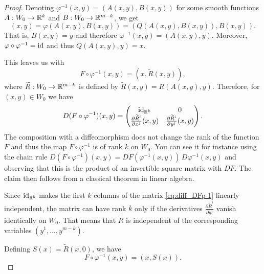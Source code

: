 \begin{proof}
	Denoting $\varphi^{-1}(x,y) = (A(x,y), B(x,y))$ for some smooth functions
	$A : W_0 \to \mathbb{R}^k$ and $B : W_0 \to \mathbb{R}^{m-k}$, we get
	\begin{equation}
		(x,y) = \varphi(A(x,y), B(x,y)) = (Q(A(x,y), B(x,y)), B(x,y)).
	\end{equation}
	That is, $B(x,y) = y$ and therefore $\varphi^{-1}(x,y) = (A(x,y), y)$.
	Moreover, $\varphi \circ \varphi^{-1} = \operatorname{id}$ and thus $Q(A(x,y),y) = x$.

	This leaves us with
	\begin{equation}
		F\circ\varphi^{-1}(x,y) = (x, \widetilde{R}(x,y)),
	\end{equation}
	where $\widetilde{R} : W_0 \to\mathbb{R}^{m-k}$ is defined by $\widetilde{R}(x,y) = R(A(x,y), y)$.
	Therefore, for $(x,y)\in W_0$ we have
	\begin{equation}\label{eq:diff_DFp-1}
		D(F\circ\varphi^{-1})(x,y) = \begin{pmatrix}
			\operatorname{id}_{\mathbb{R}^k}                                        & 0                                                 \\
			\frac{\partial\widetilde{R}^i}{\partial x^j}(x,y) & \frac{\partial\widetilde{R}^i}{\partial y^j}(x,y)
		\end{pmatrix}.
	\end{equation}
	The composition with a diffeomorphism does not change the rank of the function $F$ and
	thus the map $F\circ\varphi^{-1}$ is of rank $k$ on $W_0$.
	You can see it for instance using the chain rule
	$D(F\circ\varphi^{-1})(x,y) = DF(\varphi^{-1}(x,y))\, D\varphi^{-1}(x,y)$ and
	observing that this is the product of an invertible square matrix with $DF$.
	The claim then follows from a classical theorem in linear algebra.

	Since $\operatorname{id}_{\mathbb{R}^k}$ makes the first $k$ columns of the matrix \eqref{eq:diff_DFp-1}
	linearly independent, the matrix can have rank $k$ only if the derivatives
	$\frac{\partial \widetilde{R}^i}{\partial y^j}$ vanish identically on $W_0$.
	That means that $\widetilde{R}$ is independent of the corresponding variables
	$(y^1, \ldots, y^{m-k})$.

	Defining $S(x) = \widetilde{R}(x, 0)$, we have
	\begin{equation}
		F\circ\varphi^{-1}(x,y) = (x, S(x)).
	\end{equation}


\end{proof}
